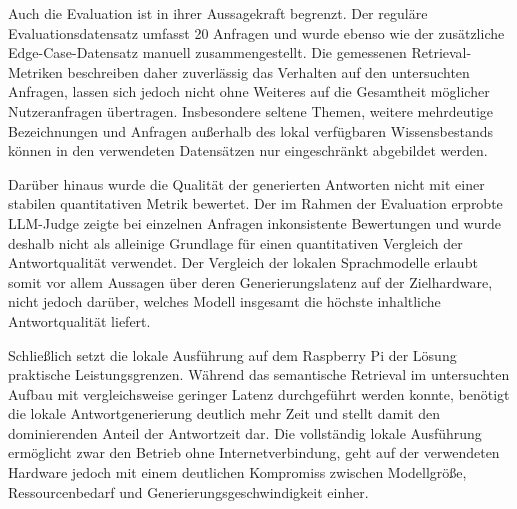 Auch die Evaluation ist in ihrer Aussagekraft begrenzt. Der reguläre
Evaluationsdatensatz umfasst 20 Anfragen und wurde ebenso wie der zusätzliche
Edge-Case-Datensatz manuell zusammengestellt. Die gemessenen Retrieval-Metriken
beschreiben daher zuverlässig das Verhalten auf den untersuchten Anfragen,
lassen sich jedoch nicht ohne Weiteres auf die Gesamtheit möglicher
Nutzeranfragen übertragen. Insbesondere seltene Themen, weitere mehrdeutige
Bezeichnungen und Anfragen außerhalb des lokal verfügbaren Wissensbestands
können in den verwendeten Datensätzen nur eingeschränkt abgebildet werden.

Darüber hinaus wurde die Qualität der generierten Antworten nicht mit einer
stabilen quantitativen Metrik bewertet. Der im Rahmen der Evaluation erprobte
LLM-Judge zeigte bei einzelnen Anfragen inkonsistente Bewertungen und wurde
deshalb nicht als alleinige Grundlage für einen quantitativen Vergleich der
Antwortqualität verwendet. Der Vergleich der lokalen Sprachmodelle erlaubt
somit vor allem Aussagen über deren Generierungslatenz auf der Zielhardware,
nicht jedoch darüber, welches Modell insgesamt die höchste inhaltliche
Antwortqualität liefert.

Schließlich setzt die lokale Ausführung auf dem Raspberry Pi der Lösung
praktische Leistungsgrenzen. Während das semantische Retrieval im untersuchten
Aufbau mit vergleichsweise geringer Latenz durchgeführt werden konnte, benötigt
die lokale Antwortgenerierung deutlich mehr Zeit und stellt damit den
dominierenden Anteil der Antwortzeit dar. Die vollständig lokale Ausführung
ermöglicht zwar den Betrieb ohne Internetverbindung, geht auf der
verwendeten Hardware jedoch mit einem deutlichen Kompromiss zwischen
Modellgröße, Ressourcenbedarf und Generierungsgeschwindigkeit einher.
